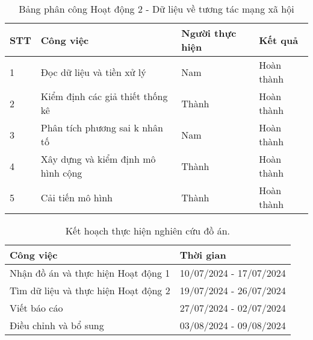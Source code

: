 \begin{table}[H]
    \centering
    \caption{Bảng phân công Hoạt động 2 - Dữ liệu về tương tác mạng xã hội}
    \label{tab:phancong6}
    \begin{tabular}{llll}
    \hline
    \multicolumn{1}{|l|}{STT} & \multicolumn{1}{l|}{Công việc}                          & \multicolumn{1}{l|}{Người thực hiện} & \multicolumn{1}{l|}{Kết quả}    \\ \hline
    \multicolumn{1}{|l|}{1}   & \multicolumn{1}{l|}{Đọc dữ liệu và tiền xử lý}          & \multicolumn{1}{l|}{Nam}             & \multicolumn{1}{l|}{Hoàn thành} \\ \hline
    \multicolumn{1}{|l|}{2}   & \multicolumn{1}{l|}{Kiểm định các giả thiết thống kê}   & \multicolumn{1}{l|}{Thành}           & \multicolumn{1}{l|}{Hoàn thành} \\ \hline
    \multicolumn{1}{|l|}{3}   & \multicolumn{1}{l|}{Phân tích phương sai k nhân tố}     & \multicolumn{1}{l|}{Nam}           & \multicolumn{1}{l|}{Hoàn thành} \\ \hline
    \multicolumn{1}{|l|}{4}   & \multicolumn{1}{l|}{Xây dựng và kiểm định mô hình cộng} & \multicolumn{1}{l|}{Thành}             & \multicolumn{1}{l|}{Hoàn thành} \\ \hline
    \multicolumn{1}{|l|}{5}   & \multicolumn{1}{l|}{Cải tiến mô hình}                   & \multicolumn{1}{l|}{Thành}           & \multicolumn{1}{l|}{Hoàn thành} \\ \hline           
    \end{tabular}
\end{table}


\begin{table}[H]
	\begin{tabular}{p{10cm}p{5cm}}
		\toprule Công việc                                                            & Thời gian                         \\
		\midrule 
        Nhận đồ án và thực hiện Hoạt động 1                 & 10/07/2024 - 17/07/2024 \\
		Tìm dữ liệu và thực hiện Hoạt động 2                                & 19/07/2024 - 26/07/2024 \\
		Viết báo cáo & 27/07/2024 - 02/07/2024 \\
		Điều chỉnh và bổ sung                                                  & 03/08/2024 - 09/08/2024 \\
		\bottomrule
	\end{tabular}
	\caption{Kết hoạch thực hiện nghiên cứu đồ án.}
	\label{tab:plan_thesis}
\end{table}




